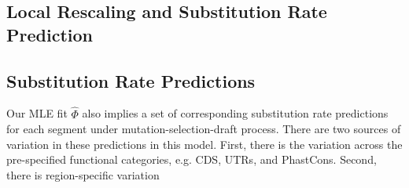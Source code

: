 \documentclass[11pt]{article}
\begin{document}
\subsection*{Local Rescaling and Substitution Rate Prediction}


\subsection*{Substitution Rate Predictions}

Our MLE fit $\hat{\Phi}$ also implies a set of corresponding substitution rate
predictions for each segment under mutation-selection-draft process. There are
two sources of variation in these predictions in this model. First, there is
the variation across the pre-specified functional categories, e.g. CDS, UTRs,
and PhastCons. Second, there is region-specific variation 










\end{document}

